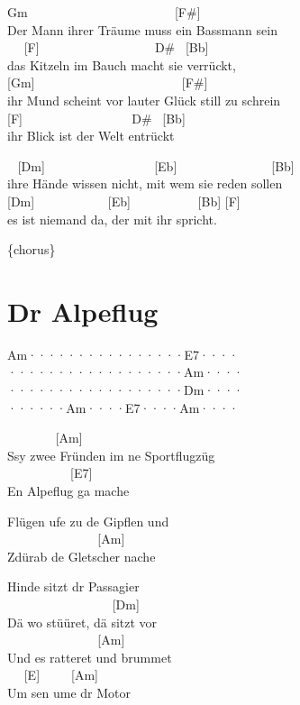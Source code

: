 \documentclass[
  letterpaper,
  twoside=false]{scrbook}
\begin{document}
Gm ~ ~ ~ ~ ~ ~ ~ ~ ~ ~ ~ ~ ~ ~{[}F\#{]}\\
Der Mann ihrer Träume muss ein Bassmann sein\\
\hspace*{0.333em} ~ ~{[}F{]} ~ ~ ~ ~ ~ ~ ~ ~ ~ ~ ~D\# ~{[}Bb{]}\\
das Kitzeln im Bauch macht sie verrückt,\\
{[}Gm{]} ~ ~ ~ ~ ~ ~ ~ ~ ~ ~ ~ ~ ~ ~{[}F\#{]}\\
ihr Mund scheint vor lauter Glück still zu schrei\textquotesingle n\\
{[}F{]} ~ ~ ~ ~ ~ ~ ~ ~ ~ ~ D\# ~{[}Bb{]}\\
ihr Blick ist der Welt entrückt

~ {[}Dm{]} ~ ~ ~ ~ ~ ~ ~ ~ ~ ~ {[}Eb{]} ~ ~ ~ ~ ~ ~ ~ ~ ~{[}Bb{]}\\
ihre Hände wissen nicht, mit wem sie reden sollen\\
\hspace*{0.333em} {[}Dm{]} ~ ~ ~ ~ ~ ~ ~{[}Eb{]} ~ ~ ~ ~ ~ ~ {[}Bb{]}
{[}F{]}\\
es ist niemand da, der mit ihr spricht.

\{chorus\}

\hypertarget{dr-alpeflug}{%
\chapter{Dr Alpeflug}\label{dr-alpeflug}}

Am····\textbar······\textbar······\textbar E7····\textbar{}\\
······\textbar······\textbar······\textbar Am····\textbar{}\\
······\textbar······\textbar······\textbar Dm····\textbar{}\\
······\textbar Am····\textbar E7····\textbar Am····\textbar{}

~ ~ ~ ~ ~{[}Am{]}\\
S\textquotesingle sy zwee Fründen im ne Sportflugzüg\\
\hspace*{0.333em} ~ ~ ~ ~ ~ ~ {[}E7{]}\\
En Alpeflug ga mache

Flügen ufe zu de Gipflen und\\
\hspace*{0.333em} ~ ~ ~ ~ ~ ~ ~ ~ ~{[}Am{]}\\
Z\textquotesingle dürab de Gletscher nache

Hinde sitzt dr Passagier\\
\hspace*{0.333em} ~ ~ ~ ~ ~ ~ ~ ~ ~ ~ {[}Dm{]}\\
Dä wo stüüret, dä sitzt vor\\
\hspace*{0.333em} ~ ~ ~ ~ ~ ~ ~ ~ ~{[}Am{]}\\
Und es ratteret und brummet\\
\hspace*{0.333em} ~ ~{[}E{]} ~ ~ ~{[}Am{]}\\
Um sen ume dr Motor
\end{document}
